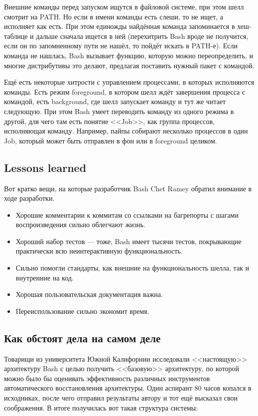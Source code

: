 \documentclass{../../text-style}
\begin{document}
Внешние команды перед запуском ищутся в файловой системе, при этом шелл смотрит на PATH. Но если в имени команды есть слеши, то не  ищет, а исполняет как есть. При этом единожды найдённая команда запоминается в хеш-таблице и дальше сначала ищется в ней (перехитрить Bash вроде не получится, если он по запомненному пути не нашёл, то пойдёт искать в PATH-е). Если команда не нашлась, Bash вызывает функцию, которую можно переопределить, и многие дистрибутивы это делают, предлагая поставить нужный пакет с командой.

Ещё есть некоторые хитрости с управлением процессами, в которых исполняются команды. Есть режим foreground, в котором шелл ждёт завершения процесса с командой, есть background, где шелл запускает команду и тут же читает следующую. При этом Bash умеет переводить команду из одного режима в другой, для чего там есть понятие <<Job>>, как группа процессов, исполняющая команду. Например, пайпы собирают несколько процессов в один Job, который может быть отправлен в фон или в foreground целиком.

\subsection{Lessons learned}

Вот кратко вещи, на которые разработчик Bash Chet Ramey обратил внимание в ходе разработки.

\begin{itemize}
    \item Хорошие комментарии к коммитам со ссылками на багрепорты с шагами воспроизведения сильно облегчают жизнь.
    \item Хороший набор тестов --- тоже, Bash имеет тысячи тестов, покрывающие практически всю неинтерактивную функциональность.
    \item Сильно помогли стандарты, как внешние на функциональность шелла, так и внутренние на код.
    \item Хорошая пользовательская документация важна.
    \item Переиспользование сильно экономит время.
\end{itemize}

\subsection{Как обстоят дела на самом деле}

Товарищи из университета Южной Калифорнии исследовали <<настоящую>> архитектуру Bash с целью получить <<базовую>> архитектуру, по которой можно было бы оценивать эффективность различных инструментов автоматического восстановления архитектуры. Один аспирант 80 часов копался в исходниках, после чего отправил результаты автору и тот ещё высказал свои соображения. В итоге получилась вот такая структура системы:
\end{document}
